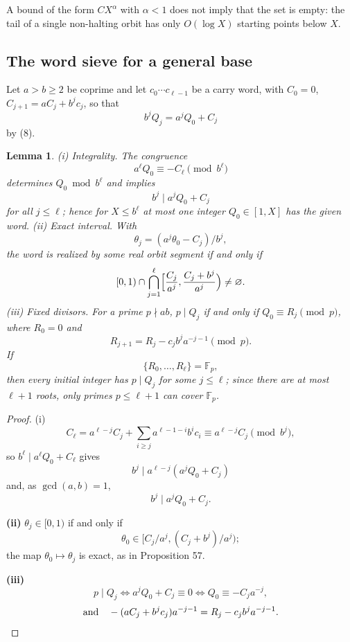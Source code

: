 \documentclass[11pt,reqno]{amsart}
\newtheorem{lemma}[theorem]{Lemma}
\theoremstyle{definition}
\theoremstyle{remark}
\begin{document}
A bound of the form \(CX^\alpha\) with \(\alpha<1\) does not imply that
the set is empty: the tail of a single non-halting orbit has only
\(O(\log X)\) starting points below \(X\).

\subsection{The word sieve for a general base}\label{sec:D.2}

\begin{samepage}\leavevmode\label{layout:carry-intro-start}
Let \(a>b\ge2\) be coprime and let \(c_0\cdots c_{\ell-1}\) be a carry
word, with \(C_0=0\), \(C_{j+1}=aC_j+b^jc_j\), so that
\[
b^jQ_j=a^jQ_0+C_j
\]
by (8).
\label{layout:carry-intro-end}\end{samepage}

\begin{samepage}
\begin{lemma}\leavevmode\label{thm:64}
(i) \emph{Integrality.} The congruence
\[
a^\ell Q_0\equiv-C_\ell\pmod{b^\ell}
\]
determines \(Q_0\bmod b^\ell\)
and implies
\[
b^j\mid a^jQ_0+C_j
\]
for all \(j\le\ell\); hence for
\(X\le b^\ell\) at most one integer \(Q_0\in[1,X]\) has the given word.
(ii) \emph{Exact interval.} With
\[
\theta_j=(a^j\theta_0-C_j)/b^j,
\]
the
word is realized by some real orbit segment if and only if
\[
[0,1)\cap\bigcap_{j=1}^{\ell}\Bigl[\frac{C_j}{a^j},\frac{C_j+b^j}{a^j}\Bigr)\ne\varnothing .
\]
(iii) \emph{Fixed divisors.} For a prime \(p\nmid ab\), \(p\mid Q_j\) if and
only if \(Q_0\equiv R_j\pmod p\), where \(R_0=0\) and
\[
R_{j+1}=R_j-c_jb^ja^{-j-1}\pmod p.
\]
If
\[
\{R_0,\ldots,R_\ell\}=\mathbb F_p,
\]
then every initial integer has
\(p\mid Q_j\) for some \(j\le\ell\); since there are at most \(\ell+1\)
roots, only primes \(p\le\ell+1\) can cover \(\mathbb F_p\).
\label{thm-end:64}
\end{lemma}
\end{samepage}

\begin{proof}\leavevmode\label{proof:64}
(i)
\[
C_\ell=a^{\ell-j}C_j+\sum_{i\ge j}a^{\ell-1-i}b^ic_i
\equiv a^{\ell-j}C_j\pmod{b^j},
\]
so \(b^\ell\mid a^\ell Q_0+C_\ell\)
gives
\[
b^j\mid a^{\ell-j}(a^jQ_0+C_j)
\]
and, as \(\gcd(a,b)=1\),
\[
b^j\mid a^jQ_0+C_j.
\]

\textbf{(ii)} \(\theta_j\in[0,1)\) if and only if
\[
\theta_0\in[C_j/a^j,(C_j+b^j)/a^j);
\]
the map
\(\theta_0\mapsto\theta_j\) is exact, as in Proposition 57.

\textbf{(iii)}
\[
p\mid Q_j\iff a^jQ_0+C_j\equiv0\iff Q_0\equiv-C_ja^{-j},
\]
\[
\text{and}\quad
-(aC_j+b^jc_j)a^{-j-1}=R_j-c_jb^ja^{-j-1}.\qedhere
\]
\end{proof}
\end{document}
